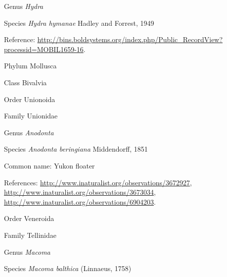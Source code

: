 \documentclass[9pt, article]{memoir}
\begin{document}
\begin{multicols}{2}
\vspace{6pt}\noindent\hspace{30pt}Genus \textit{Hydra}


\vspace{6pt}\noindent\hspace{36pt}Species \textit{Hydra hymanae} Hadley and Forrest, 1949


Reference: 
\url{http://bins.boldsystems.org/index.php/Public_RecordView?processid=MOBIL1659-16}.

\vspace{6pt}\noindent\hspace{6pt}Phylum Mollusca


\vspace{6pt}\noindent\hspace{12pt}Class Bivalvia


\vspace{6pt}\noindent\hspace{18pt}Order Unionoida


\vspace{6pt}\noindent\hspace{24pt}Family Unionidae


\vspace{6pt}\noindent\hspace{30pt}Genus \textit{Anodonta}


\vspace{6pt}\noindent\hspace{36pt}Species \textit{Anodonta beringiana} Middendorff, 1851


Common name: Yukon floater

References: 
\url{http://www.inaturalist.org/observations/3672927}, 
\url{http://www.inaturalist.org/observations/3673034}, 
\url{http://www.inaturalist.org/observations/6904203}.

\vspace{6pt}\noindent\hspace{18pt}Order Veneroida


\vspace{6pt}\noindent\hspace{24pt}Family Tellinidae


\vspace{6pt}\noindent\hspace{30pt}Genus \textit{Macoma}


\vspace{6pt}\noindent\hspace{36pt}Species \textit{Macoma balthica} (Linnaeus, 1758)



\end{multicols}
\end{document}
